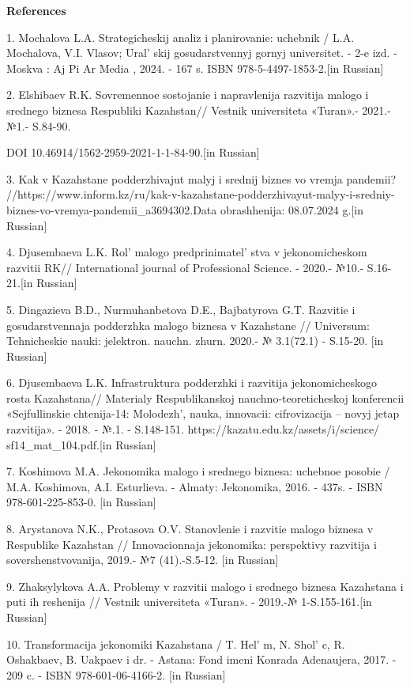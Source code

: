 {\bfseries References}

1. Mochalova L.A. Strategicheskij analiz i planirovanie: uchebnik / L.A.
Mochalova, V.I. Vlasov; Ural' skij gosudarstvennyj gornyj
universitet. - 2-e izd. - Moskva : Aj Pi Ar Media , 2024. - 167 s. ISBN
978-5-4497-1853-2.{[}in Russian{]}

2. Elshibaev R.K. Sovremennoe sostojanie i napravlenija razvitija malogo
i srednego biznesa Respubliki Kazahstan// Vestnik universiteta «Turan».-
2021.-№1.- S.84-90.

DOI 10.46914/1562-2959-2021-1-1-84-90.{[}in Russian{]}

3. Kak v Kazahstane podderzhivajut malyj i srednij biznes vo vremja
pandemii?
//https://www.inform.kz/ru/kak-v-kazahstane-podderzhivayut-malyy-i-sredniy-biznes-vo-vremya-pandemii\_a3694302.Data
obrashhenija: 08.07.2024 g.{[}in Russian{]}

4. Djusembaeva L.K. Rol'{} malogo
predprinimatel' stva v jekonomicheskom razvitii RK//
International journal of Professional Science. - 2020.- №10.-
S.16-21.{[}in Russian{]}

5. Dingazieva B.D., Nurmuhanbetova D.E., Bajbatyrova G.T. Razvitie i
gosudarstvennaja podderzhka malogo biznesa v Kazahstane // Universum:
Tehnicheskie nauki: jelektron. nauchn. zhurn. 2020.- № 3.1(72.1) -
S.15-20. {[}in Russian{]}

6. Djusembaeva L.K. Infrastruktura podderzhki i razvitija
jekonomicheskogo rosta Kazahstana// Materialy Respublikanskoj
nauchno-teoreticheskoj konferencii «Sejfullinskie chtenija-14:
Molodezh', nauka, innovacii: cifrovizacija -- novyj jetap
razvitija». - 2018. - №.1. - S.148-151.
https://kazatu.edu.kz/assets/i/science/ sf14\_mat\_104.pdf.{[}in
Russian{]}

7. Koshimova M.A. Jekonomika malogo i srednego biznesa: uchebnoe posobie
/ M.A. Koshimova, A.I. Esturlieva. - Almaty: Jekonomika, 2016. - 437s. -
ISBN 978-601-225-853-0. {[}in Russian{]}

8. Arystanova N.K., Protasova O.V. Stanovlenie i razvitie malogo biznesa
v Respublike Kazahstan // Innovacionnaja jekonomika: perspektivy
razvitija i sovershenstvovanija, 2019.- №7 (41).-S.5-12. {[}in
Russian{]}

9. Zhaksylykova A.A. Problemy v razvitii malogo i srednego biznesa
Kazahstana i puti ih reshenija // Vestnik universiteta «Turan». -
2019.-№ 1-S.155-161.{[}in Russian{]}

10. Transformacija jekonomiki Kazahstana / T. Hel' m, N.
Shol' c, R. Oshakbaev, B. Uakpaev i dr. - Astana: Fond
imeni Konrada Adenaujera, 2017. - 209 c. - ISBN 978-601-06-4166-2. {[}in
Russian{]}

